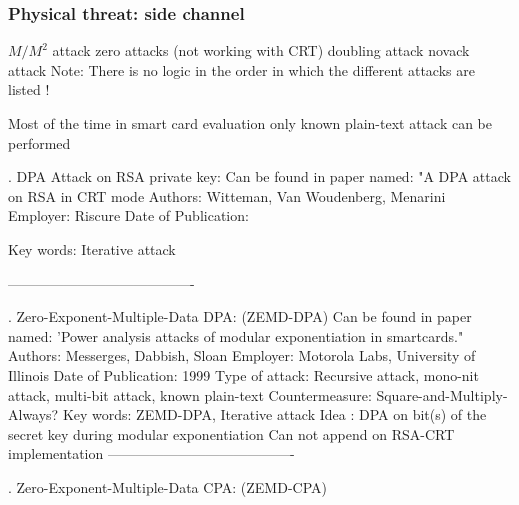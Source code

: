 \subsubsection{Physical threat: side channel}


$M/M^2$ attack
zero attacks (not working with CRT)
doubling attack
novack attack
Note: There is no logic in the order in which the different attacks are listed !


Most of the time in smart card evaluation only known plain-text attack can be performed



. DPA Attack on RSA private key:
Can be found in paper named:
                  	   	                		           "A DPA attack on RSA in CRT mode
Authors: 		
					                                    Witteman, Van Woudenberg, Menarini
Employer:           
                                     		                                                                        Riscure
Date of Publication:

Key words:       									        Iterative attack


----------------------------------------



. Zero-Exponent-Multiple-Data DPA:  (ZEMD-DPA)
Can be found in paper named:
		                              'Power analysis attacks of modular exponentiation in smartcards."
Authors: 
	                                                          		          	              Messerges, Dabbish, Sloan
Employer:
					                                          Motorola Labs, University of Illinois
Date of Publication: 
							       		                                     1999
Type of attack:
                                                      Recursive attack, mono-nit attack, multi-bit attack,  known plain-text
Countermeasure:
                                                                                                                   Square-and-Multiply-Always?
Key words: 
							                           ZEMD-DPA, Iterative attack 
Idea :   	
			            	           DPA on bit(s) of the secret key during modular exponentiation
                                                                       	           Can not append on RSA-CRT implementation
----------------------------------------









. Zero-Exponent-Multiple-Data CPA:  (ZEMD-CPA)

